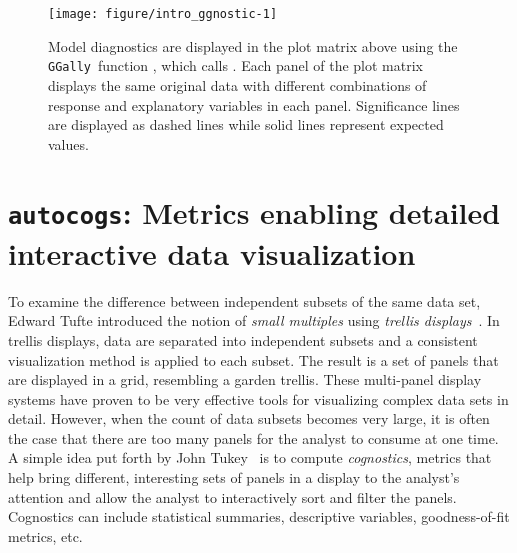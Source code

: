 \documentclass[stat,dissertation]{puthesis}\usepackage[]{graphicx}\usepackage{xcolor}
\newenvironment{knitrout}{}{} %
\renewenvironment{knitrout}{\setstretch{1}}{}
\newcommand{\pkg}[1]{\texttt{#1}}
\newcommand{\autocogs}{\pkg{autocogs}}
\newcommand{\GGally}{\pkg{GGally}}
\begin{document}
\begin{knitrout}\small
{}\color{fgcolor}\begin{figure}[H]

{\centering \texttt{[image: figure/intro\_ggnostic-1]} 

}

\caption[Model diagnostics are displayed in the plot matrix above using the \GGally~function ]{Model diagnostics are displayed in the plot matrix above using the \GGally~function , which calls .  Each panel of the plot matrix displays the same original data with different combinations of response and explanatory variables in each panel.  Significance lines are displayed as dashed lines while solid lines represent expected values.}\label{fig:intro_ggnostic}
\end{figure}


\end{knitrout}





\section{\autocogs: Metrics enabling detailed interactive data visualization}

To examine the difference between independent subsets of the same data set, Edward Tufte  introduced the notion of \emph{small multiples} using \emph{trellis displays}~\cite{small_multiples}. In trellis displays, data are separated into independent subsets and a consistent visualization method is applied to each subset. The result is a set of panels that are displayed in a grid, resembling a garden trellis.
These multi-panel display systems have proven to be very effective tools for visualizing complex data sets in detail.   However, when the count of data subsets becomes very large, it is often the case that there are too many panels for the analyst to consume at one time.  A simple idea put forth by John Tukey~\cite{Tukey1985} is to compute \emph{cognostics}, metrics that help bring different, interesting sets of panels in a display to the analyst's attention and allow the analyst to interactively sort and filter the panels.  Cognostics can include statistical summaries, descriptive variables, goodness-of-fit metrics, etc.
\end{document}
